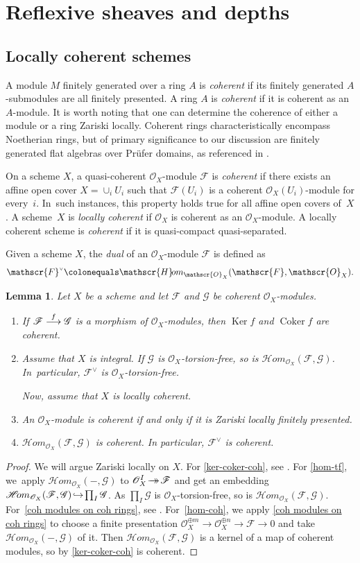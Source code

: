 \documentclass[JEP,XML,SOM,Unicode,published]{cedram}
\newenvironment{enumeratei}
{\bgroup\def\theenumi{\roman{enumi}}\def\theenumii{\arabic{enumii}}\begin{enumerate}}
{\end{enumerate}\egroup}
\newcommand\hto{\mathrel{\lhook\joinrel\to}}
\newcommand{\onto}{\mathchoice{\to\hspace*{-5mm}\to}{\to\hspace*{-2.85mm}\to}{\to\hspace*{-3mm}\to}{\to\hspace*{-3mm}\to}}
\newcommand\To[1]{\mathchoice{\xrightarrow{\textstyle\kern4pt#1\kern3pt}}{\stackrel{#1}{\longrightarrow}}{}{}}
\let\oldvee\vee
\renewcommand{\vee}{{\scriptscriptstyle\oldvee}}
\newcommand{\sF}{\mathscr{F}}
\newcommand{\sG}{\mathscr{G}}
\newcommand{\sO}{\mathscr{O}}
\newcommand{\sHom}{\mathscr{H}\! om}
\let\hra\hto
\let\ce\colonequals
\let\surjects\onto
\DeclareMathOperator{\Ker}{Ker}
\DeclareMathOperator{\Coker}{Coker}
\newcommand{\bpf}{\begin{proof}}
\newcommand{\epf}{\end{proof}}
\newcommand{\blem}{\begin{lemma}}
\newcommand{\elem}{\end{lemma}}
\newcommand{\benumr}{\begin{enumeratei}}
\newcommand{\eenumr}{\end{enumeratei}}
\providecommand{\SP}[1]{\cite[\href{https://stacks.math.columbia.edu/tag/#1}{#1}]{SP}}
\theoremstyle{plain}
\newtheorem{lemma}[subsection]{Lemma}
\theoremstyle{definition}
\begin{document}
\section{Reflexive sheaves and depths}
\subsection{Locally coherent schemes}\label{coh rings & schemes}
A module $M$ finitely generated over a ring $A$ is \emph{coherent} if its finitely generated $A$-submodules are all finitely presented.
A ring $A$ is \emph{coherent} if it is coherent as an $A$\nobreakdash-mod\-ule.
It is worth noting that one can determine the coherence of either a module or a ring Zariski locally. Coherent rings characteristically encompass Noetherian rings, but of primary significance to our discussion are finitely generated flat algebras over Prüfer domains, as referenced in .

On a scheme $X$, a quasi-coherent $\sO_X$\nobreakdash-mod\-ule $\sF$ is \emph{coherent} if there exists an affine open cover $X=\cup_i U_i$ such that $\sF(U_i)$ is a coherent $\sO_X(U_i)$\nobreakdash-mod\-ule for every~$i$. In~such instances, this property holds true for all affine open covers of~$X$. A scheme~$X$ is \emph{locally coherent} if $\sO_X$ is coherent as an $\sO_X$\nobreakdash-mod\-ule. A locally coherent scheme is \emph{coherent} if it is quasi-compact quasi-separated.

Given a scheme $X$, the \emph{dual} of an $\sO_X$\nobreakdash-mod\-ule $\sF$ is defined as
\[
\sF^{\vee}\ce \sHom_{\sO_X}(\sF,\sO_X).
\]

\blem\label{lem-coh}
Let $X$ be a scheme and let $\sF$ and $\sG$ be coherent $\sO_X$\nobreakdash-mod\-ules.
\benumr
\item\label{ker-coker-coh} {If $\sF\To{f}\sG$ is a morphism of $\sO_X$\nobreakdash-mod\-ules, then $\Ker f$ and $\Coker f$ are coherent.}
\item\label{hom-tf} Assume that $X$ is integral. If $\sG$ is $\sO_X$-torsion-free, so is $\sHom_{\sO_X}(\sF,\sG)$. In~par\-ticular, $\sF^{\vee}$ is $\sO_X$-torsion-free.

Now, assume that $X$ is locally coherent.

\item\label{coh modules on coh rings} An $\sO_X$\nobreakdash-mod\-ule is coherent if and only if it is Zariski locally finitely presented.
\item\label{hom-coh} {$\sHom_{\sO_X}(\sF,\sG)$ is coherent. In particular, $\sF^{\vee}$ is coherent.}
\eenumr
\elem
\bpf
We will argue Zariski locally on $X$.
For \eqref{ker-coker-coh}, see \SP{01BY}.
For \eqref{hom-tf}, we~apply $\sHom_{\sO_X}(-,\sG)$ to $\sO_X^I\!\surjects\! \sF$ and get an embedding \hbox{$\sHom_{\sO_X}(\sF,\sG)\!\hra\! \prod_{I}\sG$}. As $\prod_{I}\sG$ is $\sO_X$-torsion-free, so is $\sHom_{\sO_X}(\sF,\sG)$.
For~\eqref{coh modules on coh rings}, see \SP{05CX}.
For~\eqref{hom-coh}, we apply \eqref{coh modules on coh rings} to choose a finite presentation $\sO_X^{\oplus m}\to \sO_X^{\oplus n}\to \sF\to 0$ and take $\sHom_{\sO_X}(-,\sG)$ of it.
Then $\sHom_{\sO_X}(\sF,\sG)$ is a kernel of a map of coherent modules, so by \eqref{ker-coker-coh} is coherent.
\epf
\end{document}
